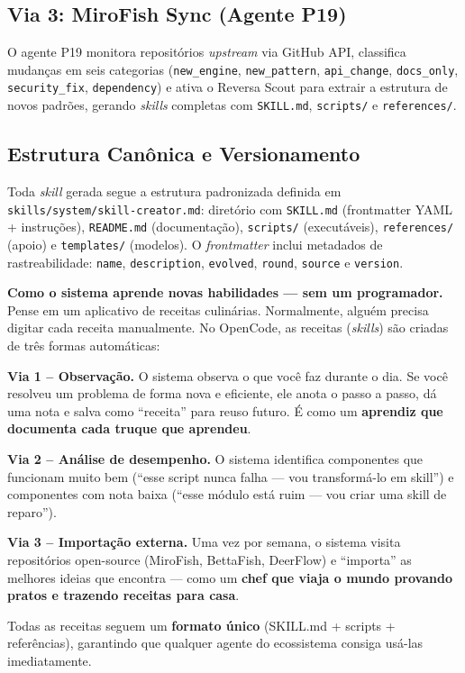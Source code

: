 \documentclass[
  article,
  12pt,
  oneside,
  a4paper,
  brazil,
  sumario=tradicional
]{abntex2}
\begin{document}
\subsection{Via 3: MiroFish Sync (Agente P19)}

O agente P19 monitora repositórios \emph{upstream} via GitHub API, classifica mudanças em seis categorias (\texttt{new\_engine}, \texttt{new\_pattern}, \texttt{api\_change}, \texttt{docs\_only}, \texttt{security\_fix}, \texttt{dependency}) e ativa o Reversa Scout para extrair a estrutura de novos padrões, gerando \emph{skills} completas com \texttt{SKILL.md}, \texttt{scripts/} e \texttt{references/}.

\subsection{Estrutura Canônica e Versionamento}

Toda \emph{skill} gerada segue a estrutura padronizada definida em \texttt{skills/\allowbreak system/\allowbreak skill-creator.md}: diretório com \texttt{SKILL.md} (frontmatter YAML + instruções), \texttt{README.md} (documentação), \texttt{scripts/} (executáveis), \texttt{references/} (apoio) e \texttt{templates/} (modelos). O \emph{frontmatter} inclui metadados de rastreabilidade: \texttt{name}, \texttt{description}, \texttt{evolved}, \texttt{round}, \texttt{source} e \texttt{version}.

\begin{leigosbox}
\textbf{Como o sistema aprende novas habilidades --- sem um programador.} Pense em um aplicativo de receitas culinárias. Normalmente, alguém precisa digitar cada receita manualmente. No OpenCode, as receitas (\emph{skills}) são criadas de três formas automáticas:

\vspace{2pt}
\noindent\textbf{Via 1 -- Observação.} O sistema observa o que você faz durante o dia. Se você resolveu um problema de forma nova e eficiente, ele anota o passo a passo, dá uma nota e salva como ``receita'' para reuso futuro. É como um \textbf{aprendiz que documenta cada truque que aprendeu}.

\vspace{2pt}
\noindent\textbf{Via 2 -- Análise de desempenho.} O sistema identifica componentes que funcionam muito bem (``esse script nunca falha --- vou transformá-lo em skill'') e componentes com nota baixa (``esse módulo está ruim --- vou criar uma skill de reparo'').

\vspace{2pt}
\noindent\textbf{Via 3 -- Importação externa.} Uma vez por semana, o sistema visita repositórios open-source (MiroFish, BettaFish, DeerFlow) e ``importa'' as melhores ideias que encontra --- como um \textbf{chef que viaja o mundo provando pratos e trazendo receitas para casa}.

\vspace{4pt}
\noindent Todas as receitas seguem um \textbf{formato único} (SKILL.md + scripts + referências), garantindo que qualquer agente do ecossistema consiga usá-las imediatamente.
\end{leigosbox}
\end{document}
